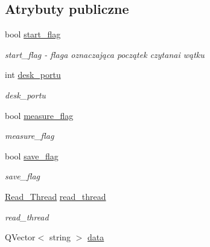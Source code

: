 \subsection*{Atrybuty publiczne}
\begin{DoxyCompactItemize}
\item 
\hypertarget{class_okno_a0cd2b4f8ec74806cc7d3256eff69385a}{bool \hyperlink{class_okno_a0cd2b4f8ec74806cc7d3256eff69385a}{start\-\_\-flag}}\label{class_okno_a0cd2b4f8ec74806cc7d3256eff69385a}

\begin{DoxyCompactList}\small\item\em start\-\_\-flag -\/ flaga oznaczająca początek czytanai wątku \end{DoxyCompactList}\item 
\hypertarget{class_okno_ac9c31fbce4cb68413088827860277510}{int \hyperlink{class_okno_ac9c31fbce4cb68413088827860277510}{desk\-\_\-portu}}\label{class_okno_ac9c31fbce4cb68413088827860277510}

\begin{DoxyCompactList}\small\item\em desk\-\_\-portu \end{DoxyCompactList}\item 
\hypertarget{class_okno_a5a94843afcfc67735c25e5a29f9cdc3c}{bool \hyperlink{class_okno_a5a94843afcfc67735c25e5a29f9cdc3c}{measure\-\_\-flag}}\label{class_okno_a5a94843afcfc67735c25e5a29f9cdc3c}

\begin{DoxyCompactList}\small\item\em measure\-\_\-flag \end{DoxyCompactList}\item 
\hypertarget{class_okno_afddfe7d21fc34910d75f92d8904acb23}{bool \hyperlink{class_okno_afddfe7d21fc34910d75f92d8904acb23}{save\-\_\-flag}}\label{class_okno_afddfe7d21fc34910d75f92d8904acb23}

\begin{DoxyCompactList}\small\item\em save\-\_\-flag \end{DoxyCompactList}\item 
\hypertarget{class_okno_a6f836849c2547fcb51936a9c88c8e75a}{\hyperlink{class_read___thread}{Read\-\_\-\-Thread} \hyperlink{class_okno_a6f836849c2547fcb51936a9c88c8e75a}{read\-\_\-thread}}\label{class_okno_a6f836849c2547fcb51936a9c88c8e75a}

\begin{DoxyCompactList}\small\item\em read\-\_\-thread \end{DoxyCompactList}\item 
\hypertarget{class_okno_af210b4fcf0872b832f3cc49bace1c48d}{Q\-Vector$<$ string $>$ \hyperlink{class_okno_af210b4fcf0872b832f3cc49bace1c48d}{data}}\label{class_okno_af210b4fcf0872b832f3cc49bace1c48d}


\end{DoxyCompactItemize}
